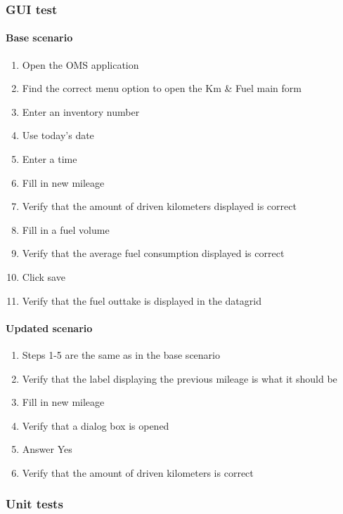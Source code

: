 \documentclass{article}
\begin{document}
			\subsubsection{GUI test}

			\paragraph{Base scenario}

			\begin{enumerate}
				\item Open the OMS application
				\item Find the correct menu option to open the Km \& Fuel main form
				\item Enter an inventory number
				\item Use today's date
				\item Enter a time
				\item Fill in new mileage
				\item Verify that the amount of driven kilometers displayed is correct
				\item Fill in a fuel volume
				\item Verify that the average fuel consumption displayed is correct
				\item Click save
				\item Verify that the fuel outtake is displayed in the datagrid
			\end{enumerate}
				
			\paragraph{Updated scenario}

			\begin{enumerate}
				\item Steps 1-5 are the same as in the base scenario
				\setcounter{enumi}{5}
				\item Verify that the label displaying the previous mileage is what it should be
				\item Fill in new mileage
				\item Verify that a dialog box is opened
				\item Answer Yes
				\item Verify that the amount of driven kilometers is correct
			\end{enumerate}

			\subsubsection{Unit tests}
\end{document}
